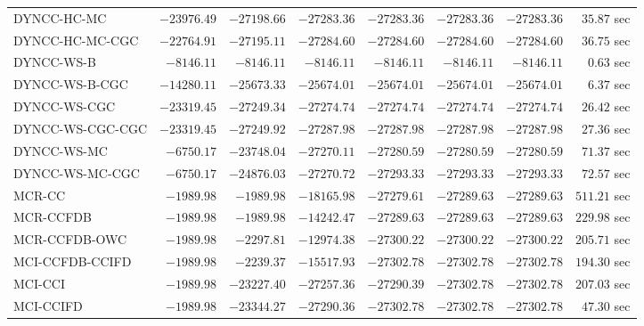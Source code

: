 \begin{table}[H]
\begin{tabular}{lrrrrrrr}
         DYNCC-HC-MC & $    -23976.49$ & $    -27198.66$ & $    -27283.36$ & $    -27283.36$ & $    -27283.36$ & $    -27283.36$ & $        35.87$ sec   \\ 
     DYNCC-HC-MC-CGC & $    -22764.91$ & $    -27195.11$ & $    -27284.60$ & $    -27284.60$ & $    -27284.60$ & $    -27284.60$ & $        36.75$ sec   \\ 
          DYNCC-WS-B & $     -8146.11$ & $     -8146.11$ & $     -8146.11$ & $     -8146.11$ & $     -8146.11$ & $     -8146.11$ & $         0.63$ sec   \\ 
      DYNCC-WS-B-CGC & $    -14280.11$ & $    -25673.33$ & $    -25674.01$ & $    -25674.01$ & $    -25674.01$ & $    -25674.01$ & $         6.37$ sec   \\ 
        DYNCC-WS-CGC & $    -23319.45$ & $    -27249.34$ & $    -27274.74$ & $    -27274.74$ & $    -27274.74$ & $    -27274.74$ & $        26.42$ sec   \\ 
    DYNCC-WS-CGC-CGC & $    -23319.45$ & $    -27249.92$ & $    -27287.98$ & $    -27287.98$ & $    -27287.98$ & $    -27287.98$ & $        27.36$ sec   \\ 
         DYNCC-WS-MC & $     -6750.17$ & $    -23748.04$ & $    -27270.11$ & $    -27280.59$ & $    -27280.59$ & $    -27280.59$ & $        71.37$ sec   \\ 
     DYNCC-WS-MC-CGC & $     -6750.17$ & $    -24876.03$ & $    -27270.72$ & $    -27293.33$ & $    -27293.33$ & $    -27293.33$ & $        72.57$ sec   \\ 
\cmidrule{1-1} 
              MCR-CC & $     -1989.98$ & $     -1989.98$ & $    -18165.98$ & $    -27279.61$ & $    -27289.63$ & $    -27289.63$ & $       511.21$ sec   \\ 
           MCR-CCFDB & $     -1989.98$ & $     -1989.98$ & $    -14242.47$ & $    -27289.63$ & $    -27289.63$ & $    -27289.63$ & $       229.98$ sec   \\ 
       MCR-CCFDB-OWC & $     -1989.98$ & $     -2297.81$ & $    -12974.38$ & $    -27300.22$ & $    -27300.22$ & $    -27300.22$ & $       205.71$ sec   \\ 
\cmidrule{1-1} 
     MCI-CCFDB-CCIFD & $     -1989.98$ & $     -2239.37$ & $    -15517.93$ & $    -27302.78$ & $    -27302.78$ & $    -27302.78$ & $       194.30$ sec   \\ 
             MCI-CCI & $     -1989.98$ & $    -23227.40$ & $    -27257.36$ & $    -27290.39$ & $    -27302.78$ & $    -27302.78$ & $       207.03$ sec   \\ 
           MCI-CCIFD & $     -1989.98$ & $    -23344.27$ & $    -27290.36$ & $    -27302.78$ & $    -27302.78$ & $    -27302.78$ & $        47.30$ sec   \\ 
\bottomrule
\end{tabular}
\end{table}